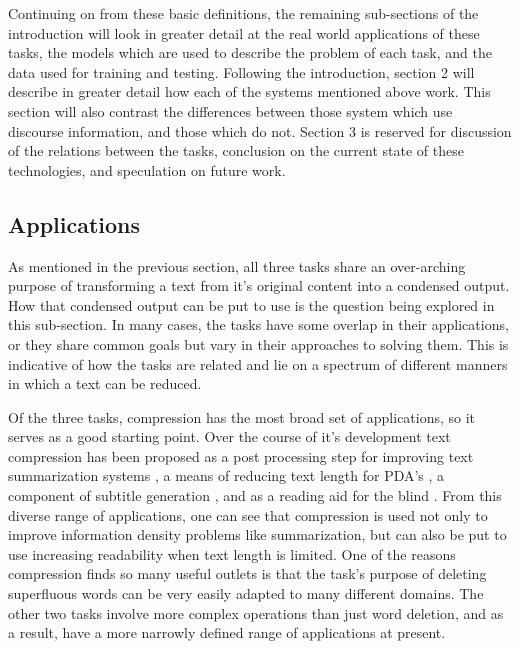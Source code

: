{{Continuing on from these basic definitions, the remaining sub-sections of the introduction will look in greater detail at the real world applications of these tasks, the models which are used to describe the problem of each task, and the data used for training and testing.  Following the introduction, section 2 will describe in greater detail how each of the systems mentioned above work. This section will also contrast the differences between those system which use discourse information, and those which do not. Section 3 is reserved for discussion of the relations between the tasks, conclusion on the current state of these technologies, and speculation on future work.}


\subsection{Applications}


{As mentioned in the previous section, all three tasks share an over-arching purpose of transforming a text from it's original content into a condensed output. How that condensed output can be put to use is the question being explored in this sub-section.  In many cases, the tasks have some overlap in their applications, or they share common goals but vary in their approaches to solving them.  This is indicative of how the tasks are related and lie on a spectrum of different manners in which a text can be reduced.}

{Of the three tasks, compression has the most broad set of applications, so it serves as a good starting point.  Over the course of it's development text compression has been proposed as a post processing step for improving text summarization systems \citep{Jing:2000:SRA:974147.974190} \citep{Knight:2002:SBS:604203.604207} , a means of reducing text length for PDA's \citep{corston2001text}, a component of subtitle generation \citep{}, and as a reading aid for the blind \citep{grefenstette1998producing}. From this diverse range of applications, one can see that compression is used not only to improve information density problems like summarization, but can also be put to  use increasing readability when text length is limited. One of the reasons compression finds so many useful outlets is that the task's purpose of deleting superfluous words can be very easily adapted to many different domains.  The other two tasks involve more complex operations than just word deletion, and as a result, have a more narrowly defined range of applications at present.}

}
